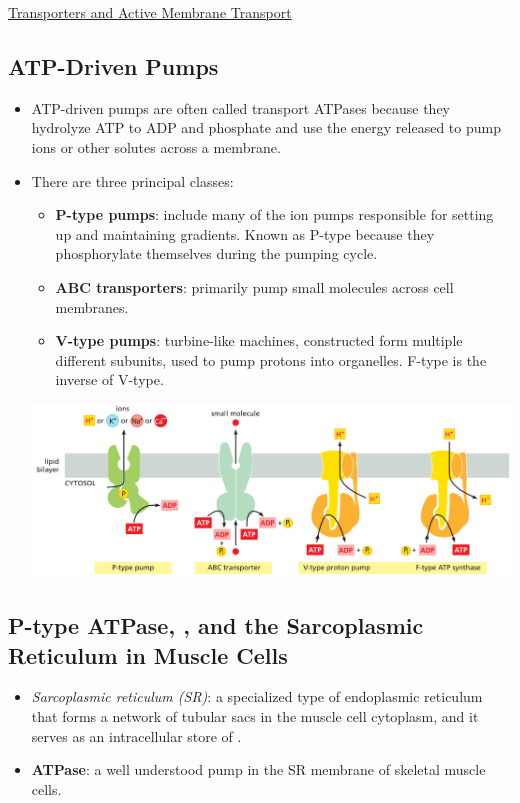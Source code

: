 \documentclass[12pt,letterpaper]{article}
\begin{document}
\begin{secbox}{\hyperlink{11}{Transporters and Active Membrane Transport}}
{    \hypertarget{11.2.3}{\subsection*{ATP-Driven Pumps}}
    \begin{itemize}
        \item ATP-driven pumps are often called transport ATPases because they hydrolyze ATP to ADP and phosphate and use the energy released to pump ions or other solutes across a membrane.
        \item There are three principal classes:
        \begin{itemize}
            \item \textbf{P-type pumps}: include many of the ion pumps responsible for setting up and maintaining gradients. Known as P-type because they phosphorylate themselves during the pumping cycle.
            \item \textbf{ABC transporters}: primarily pump small molecules across cell membranes.
            \item \textbf{V-type pumps}: turbine-like machines, constructed form multiple different subunits, used to pump protons into organelles. F-type is the inverse of V-type.
        \end{itemize}
        \includegraphics[width=\linewidth]{images/fig11-12.png}
    \end{itemize}
    \hypertarget{11.2.4}{\subsection*{P-type ATPase, , and the Sarcoplasmic Reticulum in Muscle Cells}}
    \begin{itemize}
        \item \textit{Sarcoplasmic reticulum (SR)}: a specialized type of endoplasmic reticulum that forms a network of tubular sacs in the muscle cell cytoplasm, and it serves as an intracellular store of .
        \item \textbf{ ATPase}: a well understood pump in the SR membrane of skeletal muscle cells.
    \end{itemize}

}
\end{secbox}
\end{document}
